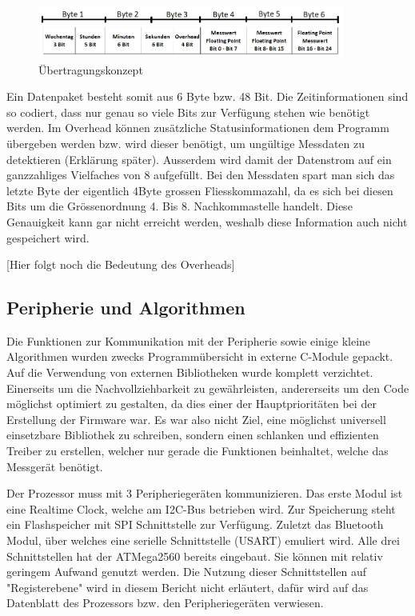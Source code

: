 \begin{figure}[H]
\begin{center}
\includegraphics[width=0.9\textwidth]{images/Software_uebertragung.png}
\caption{Übertragungskonzept}
\label{fig:Übertragungskonzept}
\end{center}
\end{figure}

Ein Datenpaket besteht somit aus 6 Byte bzw. 48 Bit. Die Zeitinformationen sind so codiert, dass nur genau so viele Bits zur Verfügung stehen wie benötigt werden. Im Overhead können zusätzliche Statusinformationen dem Programm übergeben werden bzw. wird dieser benötigt, um ungültige Messdaten zu detektieren (Erklärung später). Ausserdem wird damit der Datenstrom auf ein ganzzahliges Vielfaches von 8 aufgefüllt. Bei den Messdaten spart man sich das letzte Byte der eigentlich 4Byte grossen Fliesskommazahl, da es sich bei diesen Bits um die Grössenordnung 4. Bis 8. Nachkommastelle handelt. Diese Genauigkeit kann gar nicht erreicht werden, weshalb diese Information auch nicht gespeichert wird.

[Hier folgt noch die Bedeutung des Overheads]

\subsection{Peripherie und Algorithmen}

Die Funktionen zur Kommunikation mit der Peripherie sowie einige kleine Algorithmen wurden zwecks Programmübersicht in externe C-Module gepackt. Auf die Verwendung von externen Bibliotheken wurde komplett verzichtet. Einerseits um die Nachvollziehbarkeit zu gewährleisten, andererseits um den Code möglichst optimiert zu gestalten, da dies einer der Hauptprioritäten bei der Erstellung der Firmware war. Es war also nicht Ziel, eine möglichst universell einsetzbare Bibliothek zu schreiben, sondern einen schlanken und effizienten Treiber zu erstellen, welcher nur gerade die Funktionen beinhaltet, welche das Messgerät benötigt.
 
Der Prozessor muss mit 3 Peripheriegeräten kommunizieren. Das erste Modul ist eine Realtime Clock, welche am I2C-Bus betrieben wird. Zur Speicherung steht ein Flashspeicher mit SPI Schnittstelle zur Verfügung. Zuletzt das Bluetooth Modul, über welches eine serielle Schnittstelle (USART) emuliert wird. Alle drei Schnittstellen hat der ATMega2560 bereits eingebaut. Sie können mit relativ geringem Aufwand genutzt werden. Die Nutzung dieser Schnittstellen auf "Registerebene"  wird in diesem Bericht nicht erläutert, dafür wird auf das Datenblatt des Prozessors bzw. den Peripheriegeräten verwiesen. 

